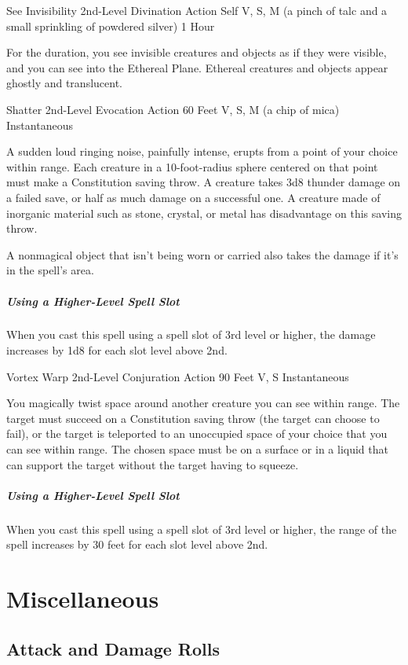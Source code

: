 \documentclass[letterpaper,openany,oneside,twocolumn]{book}
\begin{document}
\DndSpellHeader
  {See Invisibility}
  {2nd-Level Divination}
  {Action}
  {Self}
  {V, S, M (a pinch of talc and a small sprinkling of powdered silver)}
  {1 Hour}
  
For the duration, you see invisible creatures and objects as if they were visible, and you can see into the Ethereal Plane. Ethereal creatures and objects appear ghostly and translucent.

\DndSpellHeader
  {Shatter}
  {2nd-Level Evocation}
  {Action}
  {60 Feet}
  {V, S, M (a chip of mica)}
  {Instantaneous}

A sudden loud ringing noise, painfully intense, erupts from a point of your choice within range. Each creature in a 10-foot-radius sphere centered on that point must make a Constitution saving throw. A creature takes 3d8 thunder damage on a failed save, or half as much damage on a successful one. A creature made of inorganic material such as stone, crystal, or metal has disadvantage on this saving throw.

A nonmagical object that isn't being worn or carried also takes the damage if it's in the spell's area.

\subparagraph*{Using a Higher-Level Spell Slot} When you cast this spell using a spell slot of 3rd level or higher, the damage increases by 1d8 for each slot level above 2nd.

\DndSpellHeader
  {Vortex Warp}
  {2nd-Level Conjuration}
  {Action}
  {90 Feet}
  {V, S}
  {Instantaneous}

You magically twist space around another creature you can see within range. The target must succeed on a Constitution saving throw (the target can choose to fail), or the target is teleported to an unoccupied space of your choice that you can see within range. The chosen space must be on a surface or in a liquid that can support the target without the target having to squeeze.

\subparagraph*{Using a Higher-Level Spell Slot} When you cast this spell using a spell slot of 3rd level or higher, the range of the spell increases by 30 feet for each slot level above 2nd.

\vfill\eject
\section*{Miscellaneous}
\subsection*{Attack and Damage Rolls}
\end{document}
